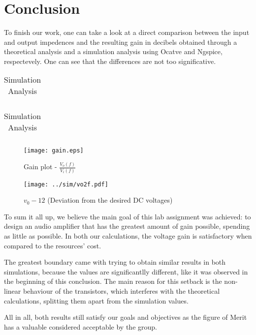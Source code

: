 \newpage{}

\section{Conclusion}
\label{sec:conclusion}
\paragraph{}
\par To finish our work, one can take a look at a direct comparison between the input and output impedences and the resulting gain in decibels obtained through a theoretical analysis and a simulation analysis using Ocatve and Ngspice, respectevely. One can see that the differences are not too significative.

\begin{table}[H]
	\begin{minipage}{.5\linewidth}
		\centering
		\begin{tabular}{|c|c|}
		\hline
		
		\end{tabular}
		\caption{Theoretical Analysis}
		\label{table1a}
	\end{minipage}
	\begin{minipage}{.5\linewidth}
		\centering
		\begin{tabular}{|c|c|}
		\hline
		
		
		
	\end{tabular}
		\caption{Simulation Analysis}
		\label{table1b}
	\end{minipage} 
\end{table}


\begin{figure}[H]
	\texttt{[image: gain.eps]}
	\centering
	\caption{Gain plot - $\frac{V_o(f)}{V_i(f)}$}
	\label{pha}
\end{figure}

\begin{figure}[H]
    \texttt{[image: ../sim/vo2f.pdf]}
    \centering
    \caption{$v_0-12$ (Deviation from the desired DC voltages)}
    \label{mag}
\end{figure}

\par To sum it all up, we believe the main goal of this lab assignment was achieved: to design an audio amplifier that has the greatest amount of gain possible, spending as little as possible. In both our calculations, the voltage gain is satisfactory when compared to the resources' cost.
\par The greatest boundary came with trying to obtain similar results in both simulations, because the values are significantlly different, like it was observed in the beginning of this conclusion. The main reason for this setback is the non-linear behaviour of the transistors, which interferes with the theoretical calculations, splitting them apart from the simulation values.
\par All in all, both results still satisfy our goals and objectives as the figure of Merit has a valuable considered acceptable by the group.






